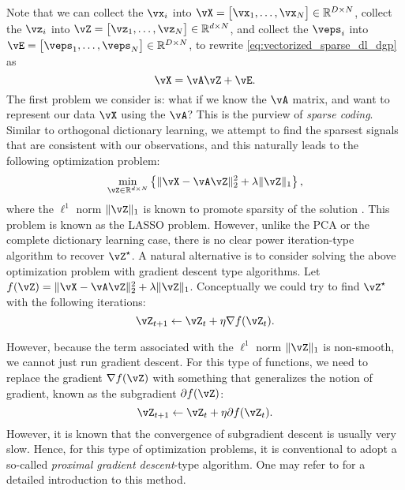 \documentclass[\toplevelprefix/book-main.tex]{subfiles}
\begin{document}
Note that we can collect the \(\vx_{i}\) into \(\vX = \mat{\vx_{1}, \dots, \vx_{N}} \in \R^{D \times N}\), collect the \(\vz_{i}\) into \(\vZ = \mat{\vz_{1}, \dots, \vz_{N}} \in \R^{d  \times N}\), and collect the \(\veps_{i}\) into \(\vE = \mat{\veps_{1}, \dots, \veps_{N}} \in \R^{D \times N}\), to rewrite \eqref{eq:vectorized_sparse_dl_dgp} as 
\begin{equation}\label{eq:sparse_dl_dgp}
    \vX = \vA\vZ + \vE.
\end{equation}
The first problem we consider is: what if we know the \(\vA\) matrix, and want to represent our data \(\vX\) using the \(\vA\)? This is the purview of \textit{sparse coding}. Similar to orthogonal dictionary learning, we attempt to find the sparsest signals that are consistent with our observations, and this naturally leads to the following optimization problem:
\begin{equation}\label{eq:sparse_dl_lasso}
    \min_{\vZ \in \R^{d \times N}}\bc{\norm{\vX - \vA\vZ}_{2}^{2} + \lambda \norm{\vZ}_{1}},
\end{equation}
where the \(\ell^1\) norm \(\norm{\vZ}_{1}\) is known to promote sparsity of the solution \cite{Wright-Ma-2022}. 
This problem is known as the LASSO problem. However, unlike the PCA or the
complete dictionary learning case, there is no clear power iteration-type
algorithm to recover \(\vZ^{\star}\). A natural alternative is to consider
solving the above optimization problem with gradient descent type algorithms.
Let \(f(\vZ) = \norm{\vX - \vA\vZ}_{2}^{2} + \lambda \norm{\vZ}_{1}\).
Conceptually we could try to find \(\vZ^{\star}\) with the following iterations:
\begin{equation}
    \vZ_{t+1} \leftarrow \vZ_t + \eta \nabla f(\vZ_t).
\end{equation}

However, because the term associated with the \(\ell^1\) norm \(\norm{\vZ}_{1}\) is non-smooth, we cannot just run gradient descent. For this type of functions, we need to replace the gradient \(\nabla f(\vZ)\) with something that generalizes the notion of gradient, known as the subgradient \(\partial f(\vZ)\):
\begin{equation}
    \vZ_{t+1} \leftarrow \vZ_t + \eta \partial f(\vZ_t).
\end{equation}
However, it is known that the convergence of subgradient descent is usually very slow. Hence, for this type of optimization problems, it is conventional to adopt a so-called {\em proximal gradient descent}-type algorithm. One may refer to \cite{Wright-Ma-2022} for a detailed introduction to this method. 
\end{document}
